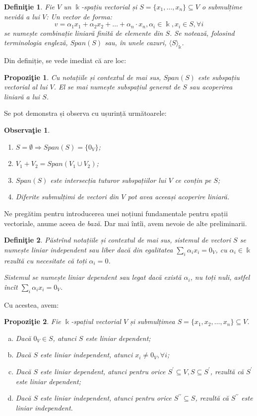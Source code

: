 \documentclass[11pt,a4paper]{article}
\newcommand\seq{\subseteq}
\theoremstyle{dotless}
\newtheorem{proposition}{Propozi\c{t}ie}[section]
\theoremstyle{dotlessdr}
\newtheorem{definition}{Defini\c{t}ie}[section]
\newtheorem{remark}{Observa\c{t}ie}[section]
\begin{document}
\begin{definition}
Fie $V$ un $\Bbbk$-spațiu vectorial și $S = \{x_1, \dots, x_n\} \seq V$ o 
submulțime nevidă a lui $V$: Un vector de forma: 
\[
v = \alpha_1 x_1 + \alpha_2 x_2 + \dots + \alpha_n \cdot x_n, 
\alpha_i \in \Bbbk, x_i \in S, \forall i
\]
se numește \emph{combinație liniară} finită de elemente din $S$. Se notează, 
folosind terminologia engleză, $Span(S)$ sau, în unele cazuri, 
$\langle S \rangle_\Bbbk$.
\end{definition}

Din definiție, se vede imediat că are loc:
\begin{proposition}
Cu notațiile și contextul de mai sus, $Span(S)$ este subspațiu vectorial al 
lui $V$. El se mai numește \emph{subspațiul generat de $S$} sau 
\emph{acoperirea liniară} a lui $S$.
\end{proposition}

Se pot demonstra și observa cu ușurință următoarele:
\begin{remark}
\begin{enumerate}[(1)]
\item $S = \emptyset \Longrightarrow Span(S) = \{0_V\}$;
\item $V_1 + V_2 = Span(V_1 \cup V_2)$;
\item $Span(S)$ este intersecția tuturor subspațiilor lui $V$ ce conțin pe $S$;
\item Diferite submulțimi de vectori din $V$ pot avea aceeași acoperire liniară.
\end{enumerate}
\end{remark}

Ne pregătim pentru introducerea unei noțiuni fundamentale pentru spații 
vectoriale, anume aceea de \emph{bază}. Dar mai întîi, avem nevoie de alte 
preliminarii.
\begin{definition}
Păstrînd notațiile și contextul de mai sus, sistemul de vectori $S$ se numește 
\emph{liniar independent} sau \emph{liber} dacă din egalitatea 
$\sum_i \alpha_i x_i = 0_V$, cu $\alpha_i \in \Bbbk$ rezultă cu necesitate că 
toți $\alpha_i = 0$.

Sistemul se numește \emph{liniar dependent} sau \emph{legat} dacă există 
$\alpha_i$, nu toți nuli, astfel încît $\sum_i \alpha_i x_i = 0_V$.
\end{definition}

Cu acestea, avem:
\begin{proposition}
Fie $\Bbbk$-spațiul vectorial $V$ și submulțimea 
$S = \{x_1, x_2, \dots, x_n \} \seq V$.
\begin{enumerate}[(a)]
\item Dacă $0_V \in S$, atunci $S$ este liniar dependent;
\item Dacă $S$ este liniar independent, atunci $x_i \neq 0_V, \forall i$;
\item Dacă $S$ este liniar dependent, atunci pentru orice 
$S^{\prime} \seq V, S \seq S^{\prime}$, rezultă că $S^{\prime}$ este 
liniar dependent;
\item Dacă $S$ este liniar independent, atunci pentru orice 
$S^{\prime\prime} \seq S$, rezultă că $S^{\prime\prime}$ este liniar 
independent.
\end{enumerate}
\end{proposition}
\end{document}
